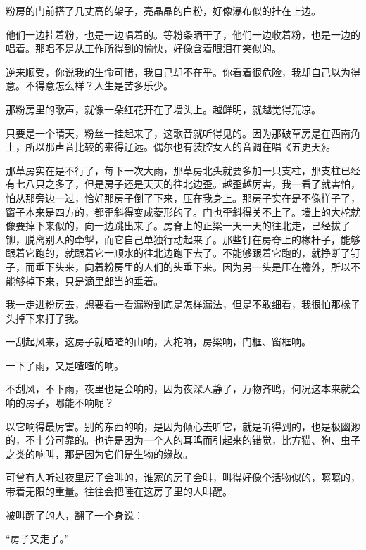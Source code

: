 \par 粉房的门前搭了几丈高的架子，亮晶晶的白粉，好像瀑布似的挂在上边。
\par 他们一边挂着粉，也是一边唱着的。等粉条晒干了，他们一边收着粉，也是一边的唱着。那唱不是从工作所得到的愉快，好像含着眼泪在笑似的。
\par 逆来顺受，你说我的生命可惜，我自己却不在乎。你看着很危险，我却自己以为得意。不得意怎么样？人生是苦多乐少。
\par 那粉房里的歌声，就像一朵红花开在了墙头上。越鲜明，就越觉得荒凉。
\par 只要是一个晴天，粉丝一挂起来了，这歌音就听得见的。因为那破草房是在西南角上，所以那声音比较的来得辽远。偶尔也有装腔女人的音调在唱《五更天》。
\par 那草房实在是不行了，每下一次大雨，那草房北头就要多加一只支柱，那支柱已经有七八只之多了，但是房子还是天天的往北边歪。越歪越厉害，我一看了就害怕，怕从那旁边一过，恰好那房子倒了下来，压在我身上。那房子实在是不像样子了，窗子本来是四方的，都歪斜得变成菱形的了。门也歪斜得关不上了。墙上的大柁就像要掉下来似的，向一边跳出来了。房脊上的正梁一天一天的往北走，已经拔了铆，脱离别人的牵掣，而它自己单独行动起来了。那些钉在房脊上的椽杆子，能够跟着它跑的，就跟着它一顺水的往北边跑下去了。不能够跟着它跑的，就挣断了钉子，而垂下头来，向着粉房里的人们的头垂下来。因为另一头是压在檐外，所以不能够掉下来，只是滴里郎当的垂着。
\par 我一走进粉房去，想要看一看漏粉到底是怎样漏法，但是不敢细看，我很怕那椽子头掉下来打了我。
\par 一刮起风来，这房子就喳喳的山响，大柁响，房梁响，门框、窗框响。
\par 一下了雨，又是喳喳的响。
\par 不刮风，不下雨，夜里也是会响的，因为夜深人静了，万物齐鸣，何况这本来就会响的房子，哪能不响呢？
\par 以它响得最厉害。别的东西的响，是因为倾心去听它，就是听得到的，也是极幽渺的，不十分可靠的。也许是因为一个人的耳鸣而引起来的错觉，比方猫、狗、虫子之类的响叫，那是因为它们是生物的缘故。
\par 可曾有人听过夜里房子会叫的，谁家的房子会叫，叫得好像个活物似的，嚓嚓的，带着无限的重量。往往会把睡在这房子里的人叫醒。
\par 被叫醒了的人，翻了一个身说：
\par “房子又走了。”
